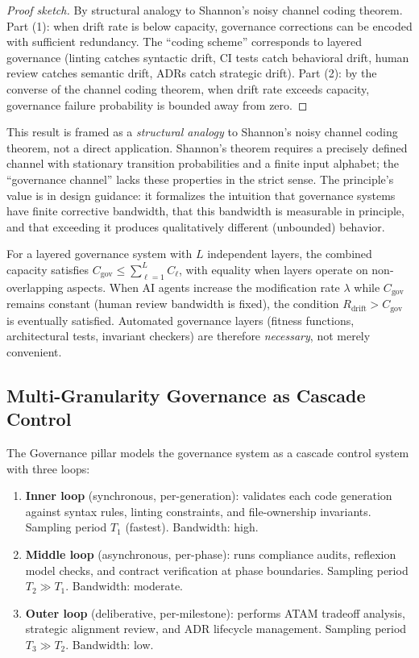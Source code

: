 \begin{proof}[Proof sketch]
By structural analogy to Shannon's noisy channel coding theorem. Part (1): when drift rate is below capacity, governance corrections can be encoded with sufficient redundancy. The ``coding scheme'' corresponds to layered governance (linting catches syntactic drift, CI tests catch behavioral drift, human review catches semantic drift, ADRs catch strategic drift). Part (2): by the converse of the channel coding theorem, when drift rate exceeds capacity, governance failure probability is bounded away from zero.
\end{proof}

\begin{remark}
This result is framed as a \emph{structural analogy} to Shannon's noisy channel coding theorem, not a direct application. Shannon's theorem requires a precisely defined channel with stationary transition probabilities and a finite input alphabet; the ``governance channel'' lacks these properties in the strict sense. The principle's value is in design guidance: it formalizes the intuition that governance systems have finite corrective bandwidth, that this bandwidth is measurable in principle, and that exceeding it produces qualitatively different (unbounded) behavior.
\end{remark}

For a layered governance system with $L$ independent layers, the combined capacity satisfies $C_{\text{gov}} \leq \sum_{\ell=1}^{L} C_\ell$, with equality when layers operate on non-overlapping aspects. When AI agents increase the modification rate $\lambda$ while $C_{\text{gov}}$ remains constant (human review bandwidth is fixed), the condition $R_{\text{drift}} > C_{\text{gov}}$ is eventually satisfied. Automated governance layers (fitness functions, architectural tests, invariant checkers) are therefore \emph{necessary}, not merely convenient.

\subsection{Multi-Granularity Governance as Cascade Control}

The Governance pillar models the governance system as a cascade control system with three loops:

\begin{enumerate}
    \item \textbf{Inner loop} (synchronous, per-generation): validates each code generation against syntax rules, linting constraints, and file-ownership invariants. Sampling period $T_1$ (fastest). Bandwidth: high.
    \item \textbf{Middle loop} (asynchronous, per-phase): runs compliance audits, reflexion model checks, and contract verification at phase boundaries. Sampling period $T_2 \gg T_1$. Bandwidth: moderate.
    \item \textbf{Outer loop} (deliberative, per-milestone): performs ATAM tradeoff analysis, strategic alignment review, and ADR lifecycle management. Sampling period $T_3 \gg T_2$. Bandwidth: low.
\end{enumerate}

